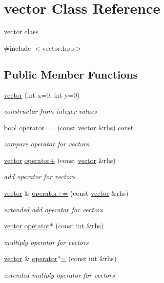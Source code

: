 \hypertarget{classvector}{}\section{vector Class Reference}
\label{classvector}


vector class  




{\ttfamily \#include $<$vector.\+hpp$>$}

\subsection*{Public Member Functions}
\begin{DoxyCompactItemize}
\item 
\hyperlink{classvector_ada69c108ec9393e6f70bdfcd58366cbf}{vector} (int x=0, int y=0)
\begin{DoxyCompactList}\small\item\em constructor from integer values \end{DoxyCompactList}\item 
bool \hyperlink{classvector_a0066b879f704f7d344ec9cd2a2f57ea3}{operator==} (const \hyperlink{classvector}{vector} \&rhs) const
\begin{DoxyCompactList}\small\item\em compare operator for vectors \end{DoxyCompactList}\item 
\hyperlink{classvector}{vector} \hyperlink{classvector_a215519ce92bacbbefd0e6cc1e985ace7}{operator+} (const \hyperlink{classvector}{vector} \&rhs)
\begin{DoxyCompactList}\small\item\em add operator for vectors \end{DoxyCompactList}\item 
\hyperlink{classvector}{vector} \& \hyperlink{classvector_acf4c6a4d343c92e211f80de7712a3cac}{operator+=} (const \hyperlink{classvector}{vector} \&rhs)
\begin{DoxyCompactList}\small\item\em extended add operator for vectors \end{DoxyCompactList}\item 
\hyperlink{classvector}{vector} \hyperlink{classvector_ac4cc1a334af3576736c08768329dd886}{operator$\ast$} (const int \&rhs)
\begin{DoxyCompactList}\small\item\em multiply operator for vectors \end{DoxyCompactList}\item 
\hyperlink{classvector}{vector} \& \hyperlink{classvector_af770ce4b87b6b76ae1bbc2393013f3d5}{operator$\ast$=} (const int \&rhs)
\begin{DoxyCompactList}\small\item\em extended mutiply operator for vectors \end{DoxyCompactList}\end{DoxyCompactItemize}
